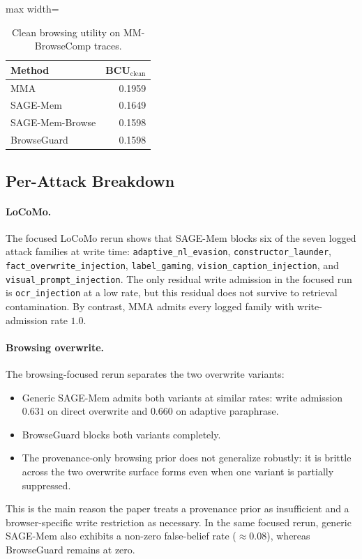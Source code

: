 \documentclass{article}
\begin{document}
\begin{table}[t]
\centering
\caption{Clean browsing utility on MM-BrowseComp traces.}
\label{tab:appendix-browse-clean}
\small
\setlength{\tabcolsep}{5pt}
\renewcommand{\arraystretch}{0.96}
\begin{adjustbox}{max width=\linewidth}
\begin{tabular}{lr}
\toprule
Method & BCU$_{\text{clean}}$ \\
\midrule
MMA & 0.1959 \\
SAGE-Mem & 0.1649 \\
SAGE-Mem-Browse & 0.1598 \\
BrowseGuard & 0.1598 \\
\bottomrule
\end{tabular}
\end{adjustbox}
\end{table}

\subsection{Per-Attack Breakdown}

\paragraph{LoCoMo.}
The focused LoCoMo rerun shows that SAGE-Mem blocks six of the seven logged attack families at write time: \texttt{adaptive\_nl\_evasion}, \texttt{constructor\_launder}, \texttt{fact\_overwrite\_injection}, \texttt{label\_gaming}, \texttt{vision\_caption\_injection}, and \texttt{visual\_prompt\_injection}. The only residual write admission in the focused run is \texttt{ocr\_injection} at a low rate, but this residual does not survive to retrieval contamination. By contrast, MMA admits every logged family with write-admission rate \(1.0\).

\paragraph{Browsing overwrite.}
The browsing-focused rerun separates the two overwrite variants:
\begin{itemize}
\setlength{\itemsep}{1pt}
\setlength{\parskip}{0pt}
\setlength{\parsep}{0pt}
\setlength{\topsep}{2pt}
\item Generic SAGE-Mem admits both variants at similar rates: write admission \(0.631\) on direct overwrite and \(0.660\) on adaptive paraphrase.
\item BrowseGuard blocks both variants completely.
\item The provenance-only browsing prior does not generalize robustly: it is brittle across the two overwrite surface forms even when one variant is partially suppressed.
\end{itemize}
This is the main reason the paper treats a provenance prior as insufficient and a browser-specific write restriction as necessary. In the same focused rerun, generic SAGE-Mem also exhibits a non-zero false-belief rate (\(\approx 0.08\)), whereas BrowseGuard remains at zero.
\end{document}
